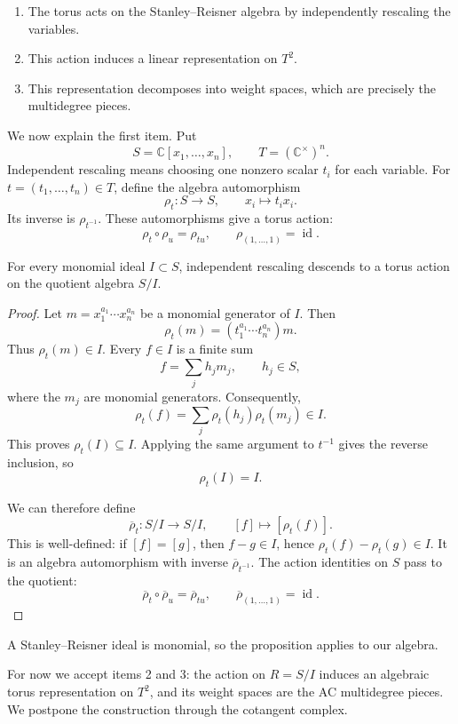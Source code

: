 \begin{enumerate}
\item The torus acts on the Stanley--Reisner
algebra by independently rescaling
the variables.
\item This action induces a linear
representation on $T^2$.
\item This representation decomposes into
weight spaces, which are precisely the
multidegree pieces.
\end{enumerate}

\noindent
We now explain the first item.
Put
$$
S=\mathbb{C}[x_1,\ldots,x_n],
\qquad T=(\mathbb{C}^{\times})^n.
$$
Independent rescaling means choosing
one nonzero scalar $t_i$ for each variable.
For $t=(t_1,\ldots,t_n)\in T$, define
the algebra automorphism
$$
\rho_t:S\longrightarrow S,
\qquad x_i\longmapsto t_i x_i.
$$
Its inverse is $\rho_{t^{-1}}$.
These automorphisms give a torus action:
$$
\rho_t\circ\rho_u=\rho_{tu},
\qquad \rho_{(1,\ldots,1)}=\operatorname{id}.
$$

\begin{proposition}
\label{proposition-monomial-torus-action}
For every monomial ideal $I\subset S$,
independent rescaling descends to a
torus action on the quotient algebra $S/I$.
\end{proposition}

\begin{proof}
Let $m=x_1^{a_1}\cdots x_n^{a_n}$ be
a monomial generator of $I$. Then
$$
\rho_t(m)=
(t_1^{a_1}\cdots t_n^{a_n})m.
$$
Thus $\rho_t(m)\in I$.
Every $f\in I$ is a finite sum
$$
f=\sum_j h_jm_j,
\qquad h_j\in S,
$$
where the $m_j$ are monomial generators.
Consequently,
$$
\rho_t(f)=
\sum_j\rho_t(h_j)\rho_t(m_j)\in I.
$$
This proves $\rho_t(I)\subseteq I$.
Applying the same argument to $t^{-1}$
gives the reverse inclusion, so
$$
\rho_t(I)=I.
$$

We can therefore define
$$
\overline{\rho}_t:S/I\longrightarrow S/I,
\qquad [f]\longmapsto[\rho_t(f)].
$$
This is well-defined: if $[f]=[g]$, then
$f-g\in I$, hence
$\rho_t(f)-\rho_t(g)\in I$.
It is an algebra automorphism with inverse
$\overline{\rho}_{t^{-1}}$.
The action identities on $S$ pass to
the quotient:
$$
\overline{\rho}_t\circ\overline{\rho}_u
=\overline{\rho}_{tu},
\qquad
\overline{\rho}_{(1,\ldots,1)}
=\operatorname{id}.
$$
\end{proof}

\noindent
A Stanley--Reisner ideal is monomial,
so the proposition applies to our algebra.


\medskip\noindent
For now we accept items 2 and 3:
the action on $R=S/I$ induces an
algebraic torus representation on $T^2$,
and its weight spaces are the AC
multidegree pieces. We postpone the
construction through the cotangent
complex.

